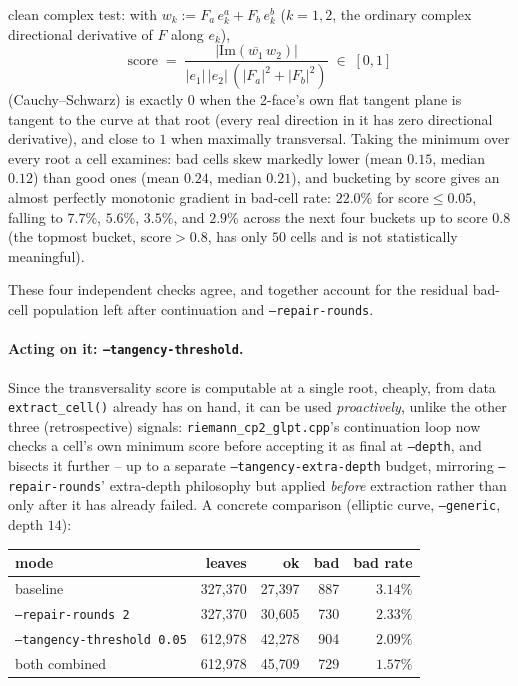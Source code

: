 \documentclass[11pt]{article}
\begin{document}
\begin{itemize}
  clean complex test: with $w_k:=F_a\,e_k^a+F_b\,e_k^b$ ($k=1,2$, the
  ordinary complex directional derivative of $F$ along $e_k$),
  \[
    \mathrm{score} \;=\; \frac{|\mathrm{Im}(\overline{w_1}\,w_2)|}
    {|e_1|\,|e_2|\,(|F_a|^2+|F_b|^2)} \;\in\;[0,1]
  \]
  (Cauchy--Schwarz) is exactly $0$ when the 2-face's own flat tangent
  plane is tangent to the curve at that root (every real direction in it
  has zero directional derivative), and close to $1$ when maximally
  transversal. Taking the minimum over every root a cell examines: bad
  cells skew markedly lower (mean $0.15$, median $0.12$) than good ones
  (mean $0.24$, median $0.21$), and bucketing by score gives an almost
  perfectly monotonic gradient in bad-cell rate: $22.0\%$ for
  score${}\le0.05$, falling to $7.7\%$, $5.6\%$, $3.5\%$, and $2.9\%$
  across the next four buckets up to score $0.8$ (the topmost bucket,
  score${}>0.8$, has only $50$ cells and is not statistically
  meaningful).
\end{itemize}

These four independent checks agree, and together account for the
residual bad-cell population left after continuation and
\texttt{--repair-rounds}.

\paragraph{Acting on it: \texttt{--tangency-threshold}.} Since the
transversality score is computable at a single root, cheaply, from data
\texttt{extract\_cell()} already has on hand, it can be used
\emph{proactively}, unlike the other three (retrospective) signals:
\texttt{riemann\_cp2\_glpt.cpp}'s continuation loop now checks a cell's
own minimum score before accepting it as final at \texttt{--depth}, and
bisects it further -- up to a separate \texttt{--tangency-extra-depth}
budget, mirroring \texttt{--repair-rounds}' extra-depth philosophy but
applied \emph{before} extraction rather than only after it has already
failed. A concrete comparison (elliptic curve, \texttt{--generic}, depth
$14$):

\begin{center}
\begin{tabular}{@{}lrrrr@{}}
\toprule
mode & leaves & ok & bad & bad rate \\
\midrule
baseline & 327{,}370 & 27{,}397 & 887 & $3.14\%$ \\
\texttt{--repair-rounds 2} & 327{,}370 & 30{,}605 & 730 & $2.33\%$ \\
\texttt{--tangency-threshold 0.05} & 612{,}978 & 42{,}278 & 904 & $2.09\%$ \\
both combined & 612{,}978 & 45{,}709 & 729 & $1.57\%$ \\
\bottomrule
\end{tabular}
\end{center}
\end{document}
